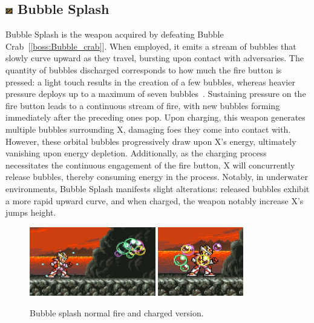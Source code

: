 \subsection{\includegraphics[width=12px, height=10px]{figures/X2/weapons/B_splash.png} Bubble Splash}\label{Bubble_splash}
Bubble Splash is the weapon acquired by defeating Bubble Crab~[\ref{boss:Bubble_crab}]. When employed, it emits a stream of bubbles that slowly curve upward as they travel, bursting upon contact with adversaries. The quantity of bubbles discharged corresponds to how much the fire button is pressed: a light touch results in the creation of a few bubbles, whereas heavier pressure deploys up to a maximum of seven bubbles~\cite{wiki:Bubble_splash}. Sustaining pressure on the fire button leads to a continuous stream of fire, with new bubbles forming immediately after the preceding ones pop. Upon charging, this weapon generates multiple bubbles surrounding X, damaging foes they come into contact with. However, these orbital bubbles progressively draw upon X's energy, ultimately vanishing upon energy depletion. Additionally, as the charging process necessitates the continuous engagement of the fire button, X will concurrently release bubbles, thereby consuming energy in the process. Notably, in underwater environments, Bubble Splash manifests slight alterations: released bubbles exhibit a more rapid upward curve, and when charged, the weapon notably increase X's jumps height.

\begin{figure}[htp]
	\centering
		\includegraphics[height=3cm]{figures/X2/weapons/B_splash_1.jpg}	
		\includegraphics[height=3cm]{figures/X2/weapons/B_splash_2.jpg}	
	\caption{Bubble splash normal fire and charged version.}
\end{figure}


